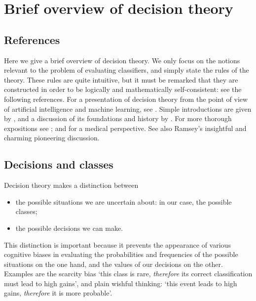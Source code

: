 \documentclass[\ifafour a4paper,12pt,\else a5paper,10pt,\fi%
onecolumn,oneside,article,%
british%
]{memoir}
\theoremstyle{remark}
\theoremstyle{innote}
\newcommand*{\wrench}{{\fontencoding{U}\fontfamily{fontawesomethree}\selectfont\symbol{114}}}
\newcommand{\mynotew}[1]{{\footnotesize\color{notecolour}\wrench\ #1}}
\renewcommand*{\|}[1][]{\nonscript\:#1\vert\nonscript\:\mathopen{}}
\newcommand*{\sect}{\S}%
\newcommand*{\chap}{ch.}%
\begin{document}




\section{Brief overview of decision theory}
\label{sec:decision_theory}

\subsection{References}
\label{sec:dt_refs}

Here we give a brief overview of decision theory. We only focus on the notions relevant to the problem of evaluating classifiers, and simply state the rules of the theory. These rules are quite intuitive, but it must be remarked that they are constructed in order to be logically and mathematically self-consistent: see the following references. For a presentation of decision theory from the point of view of artificial intelligence and machine learning, see \cite[\chap~15]{russelletal1995_r2022}. Simple introductions are given by \cite{jeffrey1965,north1968,raiffa1968_r1970}, and a discussion of its foundations and history by \cite{steeleetal2015_r2020}. For more thorough expositions see \cite{raiffaetal1961_r2000,berger1980_r1985,savage1954_r1972}; and \cite{soxetal1988_r2013,huninketal2001_r2014} for a medical perspective. See also Ramsey's \cite*{ramsey1926} insightful and charming pioneering discussion.

\subsection{Decisions and classes}
\label{sec:dt_dec_classes}

Decision theory makes a distinction between
\begin{itemize}
\item the possible situations we are uncertain about: in our case, the possible classes;
\item the possible decisions we can make.
\end{itemize}
This distinction is important because it prevents the appearance of various cognitive biases \autocites{kahnemanetal1982_r2008,gilovichetal2002_r2009,kahneman2011} in evaluating the probabilities and frequencies of the possible situations on the one hand, and the values of our decisions on the other. Examples are the scarcity bias\autocites{camereretal1989,kimetal1999,mittoneetal2009} \enquote*{this class is rare, \emph{therefore} its correct classification must lead to high gains}, and plain wishful thinking: \enquote*{this event leads to high gains, \emph{therefore} it is more probable}.
\end{document}
